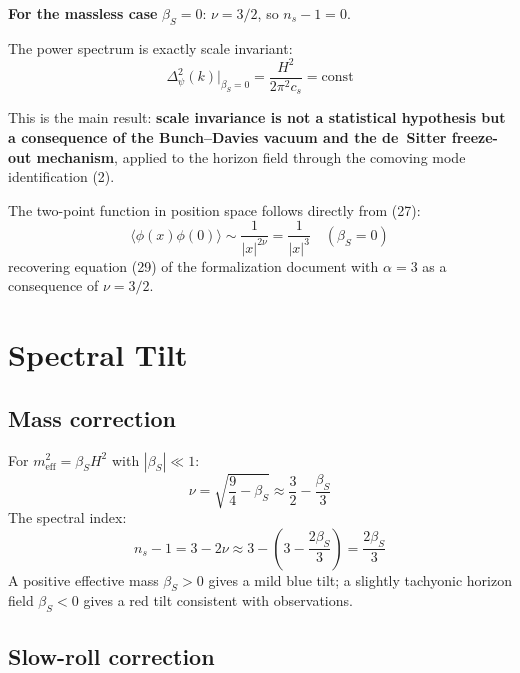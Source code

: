 \documentclass[12pt,a4paper]{article}
\begin{document}
\textbf{For the massless case} $\beta_S = 0$: $\nu = 3/2$, so $n_s - 1 = 0$.

The power spectrum is exactly scale invariant:
\begin{equation}
\Delta_\psi^2(k)\big|_{\beta_S=0} = \frac{H^2}{2\pi^2 c_s} = \text{const} \tag{27}
\end{equation}

This is the main result: \textbf{scale invariance is not a statistical hypothesis but a consequence of the Bunch--Davies vacuum and the de~Sitter freeze-out mechanism}, applied to the horizon field through the comoving mode identification (2).

The two-point function in position space follows directly from (27):
\begin{equation}
\langle\phi(x)\phi(0)\rangle \sim \frac{1}{|x|^{2\nu}} = \frac{1}{|x|^3} \quad (\beta_S = 0) \tag{28}
\end{equation}
recovering equation (29) of the formalization document with $\alpha = 3$ as a consequence of $\nu = 3/2$.

\section{Spectral Tilt}

\subsection{Mass correction}

For $m_\text{eff}^2 = \beta_S H^2$ with $|\beta_S| \ll 1$:
\begin{equation}
\nu = \sqrt{\frac{9}{4} - \beta_S} \approx \frac{3}{2} - \frac{\beta_S}{3} \tag{29}
\end{equation}
The spectral index:
\begin{equation}
n_s - 1 = 3 - 2\nu \approx 3 - \left(3 - \frac{2\beta_S}{3}\right) = \frac{2\beta_S}{3} \tag{30}
\end{equation}
A positive effective mass $\beta_S > 0$ gives a mild blue tilt; a slightly tachyonic horizon field $\beta_S < 0$ gives a red tilt consistent with observations.

\subsection{Slow-roll correction}
\end{document}
